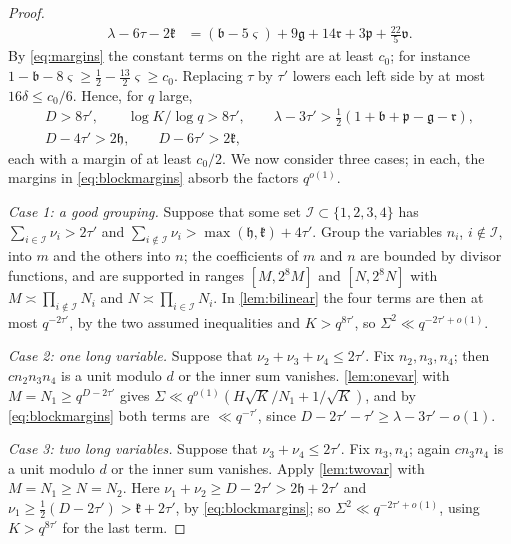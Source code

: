 \documentclass[11pt,colorlinks]{charlie}
\begin{document}
\begin{proof}
\begin{align*}
 \lambda-6\tau-2\mathfrak k&=(\mathfrak b-5\varsigma)+9\mathfrak g+14\mathfrak r+3\mathfrak p+\tfrac{22}5\mathfrak v.
\end{align*}
By \eqref{eq:margins} the constant terms on the right are at least $c_0$; for instance $1-\mathfrak b-8\varsigma\ge\frac12-\frac{13}2\varsigma\ge c_0$. Replacing $\tau$ by $\tau'$ lowers each left side by at most $16\delta\le c_0/6$. Hence, for $q$ large,
\begin{equation}\label{eq:blockmargins}
 \begin{gathered}
 D>8\tau',\qquad\log K/\log q>8\tau',\qquad\lambda-3\tau'>\tfrac12(1+\mathfrak b+\mathfrak p-\mathfrak g-\mathfrak r),\\
 D-4\tau'>2\mathfrak h,\qquad D-6\tau'>2\mathfrak k,
 \end{gathered}
\end{equation}
each with a margin of at least $c_0/2$. We now consider three cases; in each, the margins in \eqref{eq:blockmargins} absorb the factors $q^{o(1)}$.

\emph{Case 1: a good grouping.} Suppose that some set $\mathcal I\subset\{1,2,3,4\}$ has $\sum_{i\in\mathcal I}\nu_i>2\tau'$ and $\sum_{i\notin\mathcal I}\nu_i>\max(\mathfrak h,\mathfrak k)+4\tau'$. Group the variables $n_i$, $i\notin\mathcal I$, into $m$ and the others into $n$; the coefficients of $m$ and $n$ are bounded by divisor functions, and are supported in ranges $[M,2^8M]$ and $[N,2^8N]$ with $M\asymp\prod_{i\notin\mathcal I}N_i$ and $N\asymp\prod_{i\in\mathcal I}N_i$. In \cref{lem:bilinear} the four terms are then at most $q^{-2\tau'}$, by the two assumed inequalities and $K>q^{8\tau'}$, so $\Sigma^2\ll q^{-2\tau'+o(1)}$.

\emph{Case 2: one long variable.} Suppose that $\nu_2+\nu_3+\nu_4\le2\tau'$. Fix $n_2,n_3,n_4$; then $cn_2n_3n_4$ is a unit modulo $d$ or the inner sum vanishes. \cref{lem:onevar} with $M=N_1\ge q^{D-2\tau'}$ gives $\Sigma\ll q^{o(1)}(H\sqrt K/N_1+1/\sqrt K)$, and by \eqref{eq:blockmargins} both terms are $\ll q^{-\tau'}$, since $D-2\tau'-\tau'\ge\lambda-3\tau'-o(1)$.

\emph{Case 3: two long variables.} Suppose that $\nu_3+\nu_4\le2\tau'$. Fix $n_3,n_4$; again $cn_3n_4$ is a unit modulo $d$ or the inner sum vanishes. Apply \cref{lem:twovar} with $M=N_1\ge N=N_2$. Here $\nu_1+\nu_2\ge D-2\tau'>2\mathfrak h+2\tau'$ and $\nu_1\ge\frac12(D-2\tau')>\mathfrak k+2\tau'$, by \eqref{eq:blockmargins}; so $\Sigma^2\ll q^{-2\tau'+o(1)}$, using $K>q^{8\tau'}$ for the last term.


\end{proof}
\end{document}
